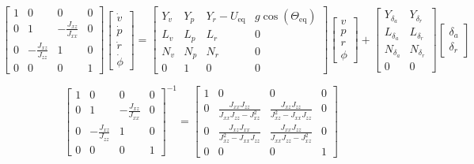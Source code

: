 \begin{equation*}
  \left[
    \begin{array}{cccc}
      1 & 0 & 0 & 0 \\[4pt]
      0 & 1 & -\frac{J_{xz}}{J_{xx}} & 0 \\[4pt]
      0 & -\frac{J_{xz}}{J_{zz}} & 1 & 0 \\[4pt]
      0 & 0 & 0 & 1
    \end{array}
  \right]
  \left[
    \begin{array}{c}
      \dot{v} \\[4pt]
      \dot{p} \\[4pt]
      \dot{r} \\[4pt]
      \dot{\phi}
    \end{array}
  \right]=
  \left[
    \begin{array}{cccc}
      Y_{v} & Y_{p} & Y_{r}-U_{\text{eq}} & g\cos(\Theta_{\text{eq}}) \\[4pt]
      L_{v} & L_{p} & L_{r} & 0 \\[4pt]
      N_{v} & N_{p} & N_{r} & 0 \\[4pt]
      0 & 1 & 0 & 0
    \end{array}
  \right]
  \left[
    \begin{array}{c}
      v \\[4pt]
      p \\[4pt]
      r \\[4pt]
      \phi
    \end{array}
  \right]+
  \left[
    \begin{array}{cc}
      Y_{\delta_{a}} & Y_{\delta_{r}} \\[4pt]
      L_{\delta_{a}} & L_{\delta_{r}} \\[4pt]
      N_{\delta_{a}} & N_{\delta_{r}} \\[4pt]
      0 & 0
    \end{array}
  \right]
  \left[
    \begin{array}{c}
    \delta_{a} \\[4pt]
    \delta_{r}
    \end{array}
  \right]
\end{equation*}

\begin{equation*}
  \left[
    \begin{array}{cccc}
      1 & 0 & 0 & 0 \\[4pt]
      0 & 1 & -\frac{J_{xz}}{J_{xx}} & 0 \\[4pt]
      0 & -\frac{J_{xz}}{J_{zz}} & 1 & 0 \\[4pt]
      0 & 0 & 0 & 1
    \end{array}
  \right]^{-1}=
  \left[
    \begin{array}{cccc}
      1 & 0 & 0 & 0 \\[4pt]
      0 & \frac{J_{xx}J_{zz}}{J_{xx}J_{zz}-J_{xz}^{2}} & \frac{J_{xz}J_{zz}}{J_{xz}^{2}-J_{xx}J_{zz}} & 0 \\[4pt]
      0 & \frac{J_{xz}J_{xx}}{J_{xz}^{2}-J_{xx}J_{zz}} &  \frac{J_{xx}J_{zz}}{J_{xx}J_{zz}-J_{xz}^{2}} & 0 \\[4pt]
      0 & 0 & 0 & 1
    \end{array}
  \right]
\end{equation*}

